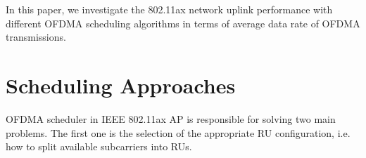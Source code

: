 \documentclass[conference]{IEEEtran}
\begin{document}
In this paper, we investigate the 802.11ax network uplink performance with different OFDMA scheduling algorithms in terms of average data rate of OFDMA transmissions.




\section{Scheduling Approaches}

OFDMA scheduler in IEEE 802.11ax AP is responsible for solving two main problems. The first one is the selection of the appropriate RU configuration, i.e. how to split available subcarriers into RUs. 
%
%	
%	
%	
%	
%	
%	
%	
%	
\end{document}
